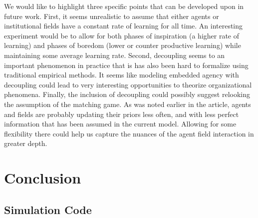 \documentclass[12pt,letterpaper]{article}
\begin{document}
We would like to highlight three specific points that can be developed upon in future work. First, it seems unrealistic to assume that either agents or institutional fields have a constant rate of learning for all time. An interesting experiment would be to allow for both phases of inspiration (a higher rate of learning) and phases of boredom (lower or counter productive learning) while maintaining some average learning rate. Second, decoupling seems to an important phenomenon in practice that is has also been hard to formalize using traditional empirical methods. It seems like modeling embedded agency with decoupling could lead to very interesting opportunities to theorize organizational phenomena. Finally, the inclusion of decoupling could possibly suggest relooking the assumption of the matching game. As was noted earlier in the article, agents and fields are probably updating their priors less often, and with less perfect information that has been assumed in the current model. Allowing for some flexibility there could help us capture the nuances of the agent field interaction in greater depth.

\section{Conclusion}

\newpage
\begin{singlespace}
 

\end{singlespace}

\newpage
\appendix
\begin{singlespace}
\section{Simulation Code}

\end{singlespace}

\end{document}
